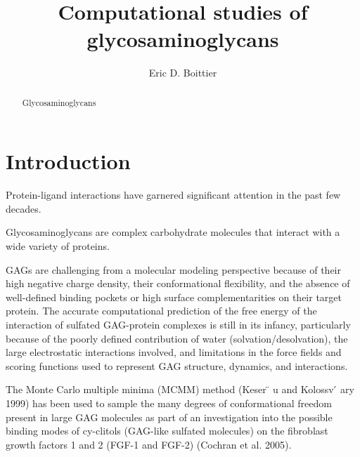 \documentclass[journal=jacsat,manuscript=article]{achemso}
\author{Eric D. Boittier}
\affiliation[UQ]
{The University of Queendland, St Lucia, Queensland, Australia}
\title[Honours]
  {Computational studies of glycosaminoglycans}
\begin{document}

\begin{abstract}
Glycosaminoglycans
\end{abstract}
\renewcommand{\contentsname}{Table of Contents}








\pagebreak
\section{Introduction}
Protein-ligand interactions have garnered significant attention in the past few decades\cite{Hricovíni2007}. 

Glycosaminoglycans are complex carbohydrate molecules that interact with a wide variety of proteins.\cite{Gandhi2008, Hricovíni2007}

GAGs are challenging from a molecular modeling perspective because of their high negative charge density, their conformational flexibility, and the absence of well-defined binding pockets or high surface complementarities on their target protein. The accurate computational prediction of the free energy of the interaction of sulfated GAG-protein complexes is still in its infancy, particularly because of the poorly defined contribution of water (solvation/desolvation), the large electrostatic interactions involved, and limitations in the force fields and scoring functions used to represent GAG structure, dynamics, and interactions.\cite{Gandi2009}

The Monte Carlo multiple minima (MCMM) method (Keser ̈ u and Kolossv ́ ary 1999) has been used to sample the many degrees of conformational freedom present in large GAG molecules as part of an investigation into the possible binding modes of cy-clitols (GAG-like sulfated molecules) on the fibroblast growth factors 1 and 2 (FGF-1 and FGF-2) (Cochran et al. 2005). \cite{Gandi2009}
\end{document}
